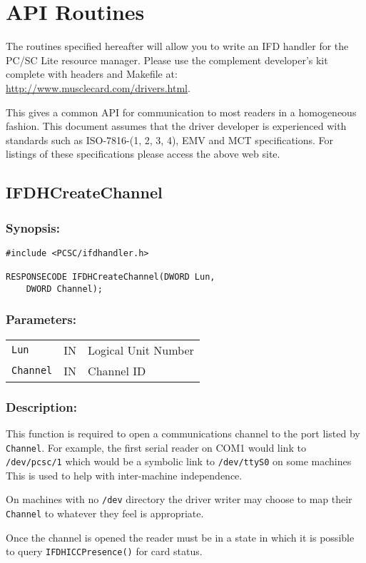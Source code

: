 \documentclass[a4paper,12pt]{article}
\newcommand{\synopsis}{\subsubsection{Synopsis:}}
\newcommand{\parameters}{\subsubsection{Parameters:}}
\newcommand{\desc}{\subsubsection{Description:}}
\begin{document}
\section{API Routines}

The routines specified hereafter will allow you to write an IFD handler
for the PC/SC Lite resource manager. Please use the complement
developer's kit complete with headers and Makefile at:
\url{http://www.musclecard.com/drivers.html}.

This gives a common API for communication to most readers in a
homogeneous fashion. This document assumes that the driver developer is
experienced with standards such as ISO-7816-(1, 2, 3, 4), EMV and MCT
specifications. For listings of these specifications please access the
above web site.


\subsection{IFDHCreateChannel}

\synopsis

\begin{verbatim}
#include <PCSC/ifdhandler.h>

RESPONSECODE IFDHCreateChannel(DWORD Lun,
    DWORD Channel);
\end{verbatim}

\parameters

\begin{tabular}{lll}
\texttt{Lun} & IN & Logical Unit Number \\
\texttt{Channel} & IN & Channel ID \\
\end{tabular}

\desc

This function is required to open a communications channel to the port
listed by \texttt{Channel}. For example, the first serial reader on COM1
would link to \texttt{/dev/pcsc/1} which would be a symbolic link to
\texttt{/dev/ttyS0} on some machines This is used to help with
inter-machine independence.

On machines with no \texttt{/dev} directory the driver writer may choose to
map their \texttt{Channel} to whatever they feel is appropriate.

Once the channel is opened the reader must be in a state in which it is
possible to query \texttt{IFDHICCPresence()} for card status.
\end{document}
